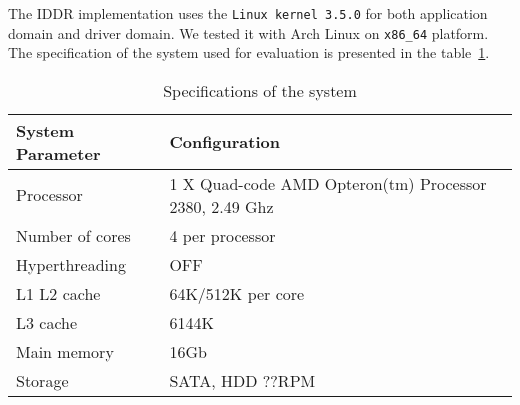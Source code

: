 The IDDR implementation uses the \texttt{Linux kernel 3.5.0} for both application domain and driver domain. We tested it with Arch Linux on \texttt{x86\_64} platform. The specification of the system used for evaluation is presented in the table~\ref{tab:config}. 

\begin{table}
\caption{Specifications of the system}
\begin{center}
\begin{tabular}{ll}
  \hline
  \label{tab:config}
  System Parameter & Configuration \\
  \hline
  Processor & 1 X Quad-code AMD Opteron(tm) Processor 2380, 2.49 Ghz \\
  Number of cores & 4 per processor \\
  Hyperthreading & OFF \\
  L1 L2 cache & 64K/512K per core \\
  L3 cache & 6144K \\
  Main memory & 16Gb \\
  Storage & SATA, HDD ??RPM \\
  \hline 
\end{tabular}
\end{center}
\end{table}

